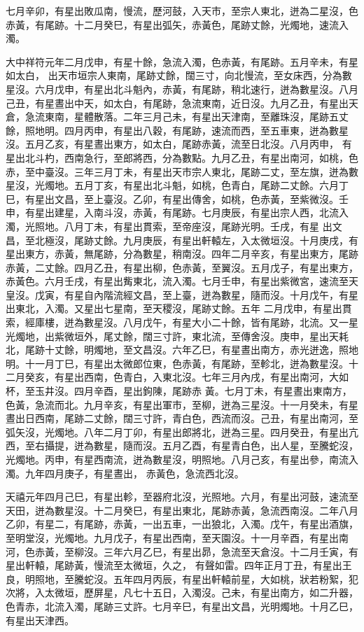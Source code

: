 \begin{pinyinscope}
 七月辛卯，有星出敗瓜南，慢流，歷河鼓，入天市，至宗人東北，迸為二星沒，色赤黃，有尾跡。十二月癸巳，有星出弧矢，赤黃色，尾跡丈餘，光燭地，速流入濁。



 大中祥符元年二月戊申，有星十餘，急流入濁，色赤黃，有尾跡。五月辛未，有星如太白，
 出天市垣宗人東南，尾跡丈餘，闊三寸，向北慢流，至女床西，分為數星沒。六月戊申，有星出北斗魁內，赤黃，有尾跡，稍北速行，迸為數星沒。八月己丑，有星晝出中天，如太白，有尾跡，急流東南，近日沒。九月乙丑，有星出天倉，急流東南，星體散落。二年三月己未，有星出天津南，至離珠沒，尾跡五丈餘，照地明。四月丙申，有星出八穀，有尾跡，速流而西，至五車東，迸為數星沒。五月乙亥，有星晝出東方，如太白，尾跡赤黃，流至日北沒。八月丙申，
 有星出北斗杓，西南急行，至郎將西，分為數點。九月乙丑，有星出南河，如桃，色赤，至中臺沒。三年三月丁未，有星出天市宗人東北，尾跡二丈，至左旗，迸為數星沒，光燭地。五月丁亥，有星出北斗魁，如桃，色青白，尾跡二丈餘。六月丁巳，有星出文昌，至上臺沒。乙卯，有星出傳舍，如桃，色赤黃，至紫微沒。壬申，有星出建星，入南斗沒，赤黃，有尾跡。七月庚辰，有星出宗人西，北流入濁，光照地。八月丁未，有星出貫索，至帝座沒，尾跡光明。壬戌，有星
 出文昌，至北極沒，尾跡丈餘。九月庚辰，有星出軒轅左，入太微垣沒。十月庚戌，有星出東方，赤黃，無尾跡，分為數星，稍南沒。四年二月辛亥，有星出東方，尾跡赤黃，二丈餘。四月乙丑，有星出柳，色赤黃，至翼沒。五月戊子，有星出東方，赤黃色。六月壬戌，有星出觜東北，流入濁。七月壬申，有星出紫微宮，速流至天皇沒。戊寅，有星自內階流經文昌，至上臺，迸為數星，隨而沒。十月戊午，有星出東北，入濁。又星出七星南，至天稷沒，尾跡丈餘。五年
 二月戊申，有星出貫索，經庫樓，迸為數星沒。八月戊午，有星大小二十餘，皆有尾跡，北流。又一星光燭地，出紫微垣外，尾丈餘，闊三寸許，東北流，至傳舍沒。庚申，星出天耗北，尾跡十丈餘，明燭地，至文昌沒。六年乙巳，有星晝出南方，赤光迸逸，照地明。十一月丁巳，有星出太微郎位東，色赤黃，有尾跡，至軫北，迸為數星沒。十二月癸亥，有星出西南，色青白，入東北沒。七年三月內戌，有星出南河，大如杯，至玉井沒。四月辛酉，星出鉤陳，尾跡赤
 黃。七月丁未，有星晝出東南方，色黃，急流而北。九月辛亥，有星出軍市，至柳，迸為三星沒。十一月癸未，有星晝出日西南，尾跡二丈餘，闊三寸許，青白色，西流而沒。己丑，有星出南河，至弧矢沒，光燭地。八年二月丁卯，有星出郎將北，迸為三星。四月癸丑，有星出亢西，至右攝提，迸為數星，隨而沒。五月乙酉，有星青白色，出人星，至騰蛇沒，光燭地。丙申，有星西南流，迸為數星沒，明照地。八月己亥，有星出參，南流入濁。九年四月庚子，有星晝出，
 赤黃色，急流西北沒。



 天禧元年四月己巳，有星出軫，至器府北沒，光照地。六月，有星出河鼓，速流至天田，迸為數星沒。十二月癸巳，有星出東北，尾跡赤黃，急流西南沒。二年八月乙卯，有星二，有尾跡，赤黃，一出五車，一出狼北，入濁。戊午，有星出酒旗，至明堂沒，光燭地。九月戊子，有星出西南，至天園沒。十一月辛酉，有星出南河，色赤黃，至柳沒。三年六月乙巳，有星出昴，急流至天倉沒。十二月壬寅，有星出軒轅，尾跡黃，慢流至太微垣，久之，
 有聲如雷。四年正月丁丑，有星出王良，明照地，至騰蛇沒。五年四月丙辰，有星出軒轅前星，大如桃，狀若粉絮，犯次將，入太微垣，歷屏星，凡七十五日，入濁沒。己未，有星出南方，如二升器，色青赤，北流入濁，尾跡三丈許。七月辛巳，有星出文昌，光明燭地。十月乙巳，有星出天津西。




\end{pinyinscope}
